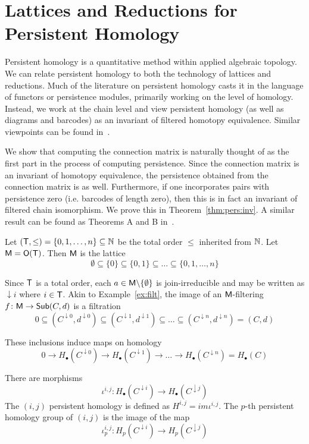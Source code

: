 
\section{Lattices and Reductions for Persistent Homology}\label{sec:PH}



Persistent homology is a quantitative method within applied algebraic topology.  We can relate persistent homology to both the technology of lattices and reductions. Much of the literature on persistent homology casts it in the language of functors or persistence modules, primarily working on the level of homology.  Instead, we work at the chain level and view persistent homology (as well as diagrams and barcodes) as an invariant of filtered homotopy equivalence.  Similar viewpoints can be found in~\cite{mn,uz}.

We show that computing the connection matrix is naturally thought of as the first part in the process of computing persistence.  Since the connection matrix is an invariant of homotopy equivalence, the persistence obtained from the connection matrix is as well.  Furthermore,  if one incorporates pairs with persistence zero (i.e. barcodes of length zero), then this is in fact an invariant of filtered chain isomorphism.  We prove this in Theorem~\ref{thm:pers:inv}.  A similar result can be found as Theorems A and B in~\cite{uz}.



   Let $({\mathsf T},\leq)=\{0,1,\ldots, n\}\subseteq {\mathbb{N}}$ be the total order $\leq$ inherited from ${\mathbb{N}}$. Let ${\mathsf M}={\mathsf O}({\mathsf T})$.  Then ${\mathsf M}$ is the lattice 
\[
\emptyset \subseteq \{0\}\subseteq \{0,1\}\subseteq \ldots \subseteq \{0,1,\ldots,n\}
\] 
 
Since ${\mathsf T}$ is a total order, each $a\in {\mathsf M} \backslash \{\emptyset\}$ is join-irreducible and may be written as $\downarrow i$ where $i\in {\mathsf T}$.   Akin to Example~\ref{ex:filt}, the image of an ${\mathsf M}$-filtering $f\colon {\mathsf M}\to \mathsf{Sub}(C,d)$ is a filtration 
\[
0\subseteq (C^{\downarrow 0},d^{\downarrow 0})\subseteq (C^{\downarrow 1},d^{\downarrow 1}) \subseteq \ldots \subseteq (C^{\downarrow n},d^{\downarrow n}) = (C,d)
\]

These inclusions induce maps on homology
\[
0\to H_\bullet(C^{\downarrow 0})\to H_\bullet(C^{\downarrow 1}) \to\ldots \to H_\bullet(C^{\downarrow n}) = H_\bullet(C)
\]

There are morphisms $$\iota^{i,j}:H_\bullet (C^{\downarrow i})\to H_\bullet (C^{\downarrow j})$$  The $(i,j)$ persistent homology is defined as $H^{i,j} = im\iota^{i,j}$.  The $p$-th persistent homology group of $(i,j)$ is the image of the map $$\iota^{i,j}_p:H_p(C^{\downarrow i})\to H_p(C^{\downarrow j})$$

